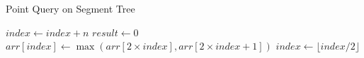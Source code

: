 \begin{algorithm}
    \caption{Point Query on Segment Tree }
    \begin{algorithmic}
            \State $index \gets index + n$ 
            \State $result \gets 0$ 
                \State $arr[index] \gets \max(arr[2 \times index], arr[2 \times index + 1])$
                \State $index \gets \lfloor index / 2 \rfloor$
            \EndWhile
        \EndProcedure
    \end{algorithmic}
\end{algorithm}